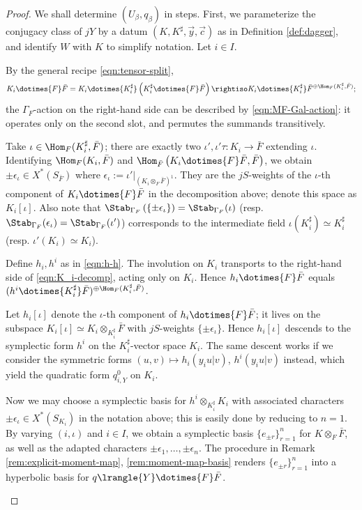 \documentclass[a4paper,10pt]{article}
\begin{document}
\begin{proof}
	We shall determine $(U_\beta, q_\beta)$ in steps. First, we parameterize the conjugacy class of $jY$ by a datum $(K, K^\sharp, \vec{y}, \vec{c})$ as in Definition \ref{def:dagger}, and identify $W$ with $K$ to simplify notation. Let $i \in I$.
	\begin{asparaenum}
		\item By the general recipe \eqref{eqn:tensor-split},
			\begin{equation}\label{eqn:K_i-decomp}
				K_i \dotimes{F} \bar{F} = K_i \dotimes{K_i^\sharp} \left( K_i^\sharp \dotimes{F} \bar{F} \right) \rightiso K_i \dotimes{K_i^\sharp} \bar{F}^{\oplus \Hom_F(K_i^\sharp, \bar{F}) };
			\end{equation}
			the $\Gamma_F$-action on the right-hand side can be described by \eqref{eqn:MF-Gal-action}: it operates only on the second slot, and permutes the summands transitively.
			
			Take $\iota \in \Hom_F(K_i^\sharp, \bar{F})$; there are exactly two $\iota', \iota'\tau: K_i \to \bar{F}$ extending $\iota$. Identifying $\Hom_F(K_i, \bar{F})$ and $\Hom_{\bar{F}}\left( K_i \dotimes{F} \bar{F}, \bar{F}\right)$, we obtain $\pm\epsilon_\iota \in X^*(S_{\bar{F}})$ where $\epsilon_\iota := \iota'|_{(K_i \otimes_F \bar{F})^1}$. They are the $jS$-weights of the $\iota$-th component of $K_i \dotimes{F} \bar{F}$ in the decomposition above; denote this space as $K_i[\iota]$. Also note that $\Stab_{\Gamma_F}\left( \{\pm\epsilon_\iota\}\right) = \Stab_{\Gamma_F}(\iota)$ (resp. $\Stab_{\Gamma_F}(\epsilon_\iota) = \Stab_{\Gamma_F}(\iota')$) corresponds to the intermediate field $\iota(K_i^\sharp) \simeq K_i^\sharp$ (resp. $\iota'(K_i) \simeq K_i$).
		\item Define $h_i, h^i$ as in \eqref{eqn:h-h}. The involution on $K_i$ transports to the right-hand side of \eqref{eqn:K_i-decomp}, acting only on $K_i$. Hence $h_i \dotimes{F} \bar{F}$ equals $(h^i \dotimes{K_i^\sharp} \bar{F})^{\oplus \Hom_F(K_i^\sharp, \bar{F}) }$.
		
		Let $h_i[\iota]$ denote the $\iota$-th component of $h_i \dotimes{F} \bar{F}$; it lives on the subspace $K_i[\iota] \simeq K_i \otimes_{K_i^\sharp} \bar{F}$ with $jS$-weights $\{\pm\epsilon_\iota\}$. Hence $h_i[\iota]$ descends to the symplectic form $h^i$ on the $K_i^\sharp$-vector space $K_i$. The same descent works if we consider the symmetric forms $(u, v) \mapsto h_i(y_i u|v)$, $h^i(y_i u|v)$ instead, which yield the quadratic form $q_{i,Y}^0$ on $K_i$.
		\item Now we may choose a symplectic basis for $h^i \otimes_{K_i^\sharp} K_i$ with associated characters $\pm\epsilon_\iota \in X^*(S_{K_i})$ in the notation above; this is easily done by reducing to $n=1$. By varying $(i, \iota)$ and $i \in I$, we obtain a symplectic basis $\{e_{\pm r}\}_{r=1}^n$ for $K \otimes_F \bar{F}$, as well as the adapted characters $\pm\epsilon_1, \ldots, \pm\epsilon_n$. The procedure in Remark \ref{rem:explicit-moment-map}, \ref{rem:moment-map-basis} renders $\{e_{\pm r}\}_{r=1}^n$ into a hyperbolic basis for $q\lrangle{Y} \dotimes{F} \bar{F}$.
		

\end{asparaenum}
\end{proof}
\end{document}
